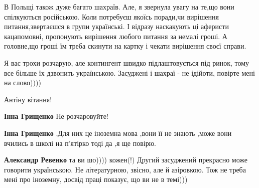 \begin{itemize}
В Польщі також дуже багато шахраїв. Але, я звернула увагу на те,що вони
спілкуються російською. Коли потребуєш якоїсь поради,чи вирішення
питання,звертаєшся в групи українські. І відразу наскакують ці аферисти
кацапомовні, пропонують вирішення любого питання за немалі гроші. А головне,що
гроші їм треба скинути на картку і чекати вирішення своєї справи.


 

Я вас трохи розчарую, але контингент швидко підлаштовується під ринок, тому все
більше їх дзвонить українською. Засуджені і шахраї - не ідійоти, повірте мені
на слово))))

Антіну вітання!

\begin{itemize}
 
\textbf{Інна Грищенко} Не розчаровуйте! \Smiley[1.0][yellow]

 
\textbf{Інна Грищенко} ,Для них це іноземна мова ,вони її не знають ,може вони вчились в школі на п'ятірко тоді да ,я ще повірю.

 
\textbf{Александр Ревенко} та ви шо)))) кожен(!) Другий засуджений прекрасно може говорити українською. Не літературною, звісно, але й азіровкою. Тож не треба мені про іноземну, досвід праці показує, що ви не в темі)))

 

\end{itemize}
\end{itemize}
